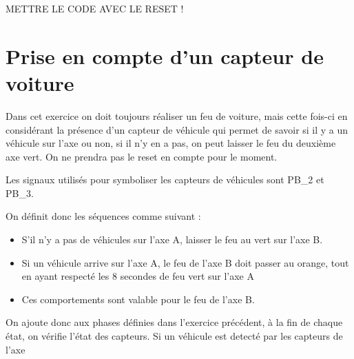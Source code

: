 \documentclass[11pt]{report}
\begin{document}
METTRE LE CODE AVEC LE RESET !

\section{Prise en compte d'un capteur de voiture}


Dans cet exercice on doit toujours réaliser un feu de voiture, mais cette fois-ci en considérant la présence d'un capteur de véhicule qui permet de savoir si il y a un véhicule sur l'axe ou non, si il n'y en a pas, on peut laisser le feu du deuxième axe vert. On ne prendra pas le reset en compte pour le moment.

Les signaux utilisés pour symboliser les capteurs de véhicules sont PB\_2 et PB\_3.

On définit donc les séquences comme suivant :
\begin{itemize}
	\item S'il n'y a pas de véhicules sur l'axe A, laisser le feu au vert sur l'axe B.
	\item Si un véhicule arrive sur l'axe A, le feu de l'axe B doit passer au orange, tout en ayant respecté les 8 secondes de feu vert sur l'axe A
	\item Ces comportements sont valable pour le feu de l'axe B. 

\end{itemize}

On ajoute donc aux phases définies dans l'exercice précédent, à la fin de chaque état, on vérifie l'état des capteurs. Si un véhicule est detecté par les capteurs de l'axe
\end{document}
